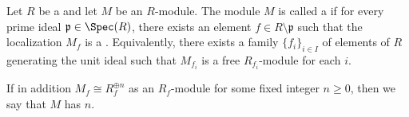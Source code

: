\begin{definition} \label{definition:locally_free_module_over_a_commutative_ring}
    Let $R$ be a  and let $M$ be an $R$-module. The module $M$ is called a  if for every prime ideal $\mathfrak{p} \in \Spec(R)$, there exists an element $f \in R \setminus \mathfrak{p}$ such that the localization $M_f$ is a . Equivalently, there exists a family $\{f_i\}_{i \in I}$ of elements of $R$ generating the unit ideal such that $M_{f_i}$ is a free $R_{f_i}$-module for each $i$.

    If in addition $M_f \cong R_f^{\oplus n}$ as an $R_f$-module for some fixed integer $n \geq 0$, then we say that $M$ has  $n$.
\end{definition}
